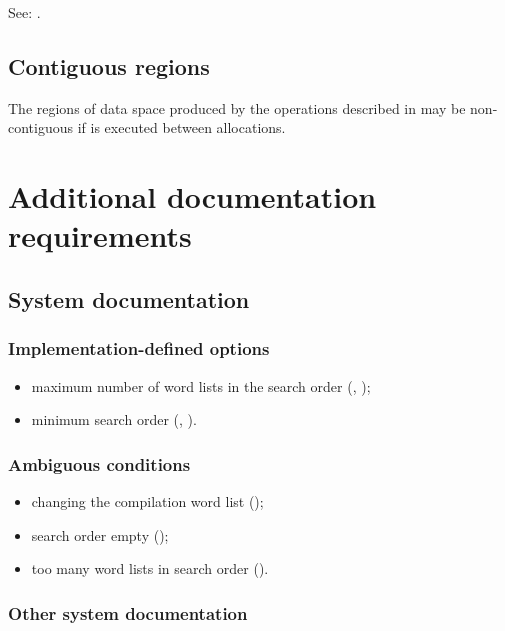 See: .


\subsection{Contiguous regions} %

The regions of data space produced by the operations described in
 may be
non-contiguous if  is executed between allocations.

\section{Additional documentation requirements} %

\subsection{System documentation} %

\subsubsection{Implementation-defined options} %

\begin{itemize}
\item maximum number of word lists in the search order
	(,
	 );
\item minimum search order
	(,
	 ).
\end{itemize}

\subsubsection{Ambiguous conditions} %

\begin{itemize}
\item changing the compilation word list
	();
\item search order empty
	();
\item too many word lists in search order
	().
\end{itemize}

\subsubsection{Other system documentation} %

